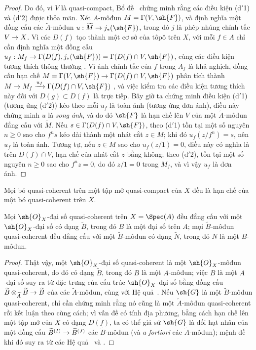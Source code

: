 \documentclass[oneside]{amsart}
\makeatletter
\renewcommand{\geq}{\geqslant}
\newcommand{\ega@arrow}[2]{\mathchoice{#1}{#2}{#2}{#2}}
\renewcommand{\to}{\ega@arrow{\longrightarrow}{\rightarrow}}
\let\EGAOriginalLabel\label
\renewcommand{\label}[1]{\phantomsection\EGAOriginalLabel{#1}}
\makeatother
\begin{document}
\begin{proof}
Do đó, vì $V$ là quasi-compact, Bổ đề~ chứng minh rằng các điều kiện (d$'$1) và (d$'$2) được thỏa mãn.
Xét $A$-môđun $M=\Gamma(V,\sh{F})$, và định nghĩa một đồng cấu các $\widetilde{A}$-môđun $u:\widetilde{M}\to j_*(\sh{F})$, trong đó $j$ là phép nhúng chính tắc $V\to X$.
Vì các $D(f)$ tạo thành một cơ sở của tôpô trên $X$, với mỗi $f\in A$ chỉ cần định nghĩa một đồng cấu $u_f:M_f\to\Gamma(D(f),j_*(\sh{F}))=\Gamma(D(f)\cap V,\sh{F})$, cùng các điều kiện tương thích thông thường .
Vì ảnh chính tắc của $f$ trong $A_f$ là khả nghịch, đồng cấu hạn chế $M=\Gamma(V,\sh{F})\to\Gamma(D(f)\cap V,\sh{F})$ phân tích thành $M\to M_f\xrightarrow{u_f}\Gamma(D(f)\cap V,\sh{F})$ , và việc kiểm tra các điều kiện tương thích này đối với $D(g)\subset D(f)$ là trực tiếp.
Bây giờ ta chứng minh điều kiện (d$'$1) (tương ứng (d$'$2)) kéo theo mỗi $u_f$ là toàn ánh (tương ứng đơn ánh), điều này chứng minh $u$ là \emph{song ánh}, và do đó $\sh{F}$ là hạn chế lên $V$ của một $\widetilde{A}$-môđun đẳng cấu với $\widetilde{M}$.
Nếu $s\in\Gamma(D(f)\cap V,\sh{F})$, theo (d$'$1) tồn tại một số nguyên $n\geq 0$ sao cho $f^n s$ kéo dài thành một nhát cắt $z\in M$;
khi đó $u_f(z/f^n)=s$, nên $u_f$ là toàn ánh.
Tương tự, nếu $z\in M$ sao cho $u_f(z/1)=0$, điều này có nghĩa là trên $D(f)\cap V$, hạn chế của nhát cắt $z$ bằng không;
theo (d$'$2), tồn tại một số nguyên $n\geq 0$ sao cho $f^n z=0$, do đó $z/1=0$ trong $M_f$, và vì vậy $u_f$ là đơn ánh.
\end{proof}

\begin{corollary}[1.4.2]
\label{I.1.4.2}
Mọi bó quasi-coherent trên một tập mở quasi-compact của $X$ đều là hạn chế của một bó quasi-coherent trên $X$.
\end{corollary}

\begin{corollary}[1.4.3]
\label{I.1.4.3}
Mọi $\sh{O}_X$-đại số quasi-coherent trên $X=\Spec(A)$ đều đẳng cấu với một $\sh{O}_X$-đại số có dạng $\widetilde{B}$, trong đó $B$ là một đại số trên $A$;
mọi $\widetilde{B}$-môđun quasi-coherent đều đẳng cấu với một $\widetilde{B}$-môđun có dạng $\widetilde{N}$, trong đó $N$ là một $B$-môđun.
\end{corollary}

\begin{proof}
Thật vậy, một $\sh{O}_X$-đại số quasi-coherent là một $\sh{O}_X$-môđun quasi-coherent, do đó có dạng $\widetilde{B}$, trong đó $B$ là một $A$-môđun;
việc $B$ là một $A$-đại số suy ra từ đặc trưng của cấu trúc $\sh{O}_X$-đại số bằng đồng cấu $\widetilde{B}\otimes_{\widetilde{A}}\widetilde{B}\to\widetilde{B}$ của các $\widetilde{A}$-môđun, cùng với Hệ quả~.
Nếu $\sh{G}$ là một $\widetilde{B}$-môđun quasi-coherent, chỉ cần chứng minh rằng nó cũng là một $\widetilde{A}$-môđun quasi-coherent rồi kết luận theo cùng cách;
vì vấn đề có tính địa phương, bằng cách hạn chế lên một tập mở của $X$ có dạng $D(f)$, ta có thể giả sử $\sh{G}$ là đối hạt nhân của một đồng cấu $\widetilde{B}^{(I)}\to\widetilde{B}^{(J)}$ các $\widetilde{B}$-môđun (và \emph{a fortiori} các $\widetilde{A}$-môđun);
mệnh đề khi đó suy ra từ các Hệ quả~ và .
\end{proof}
\end{document}
